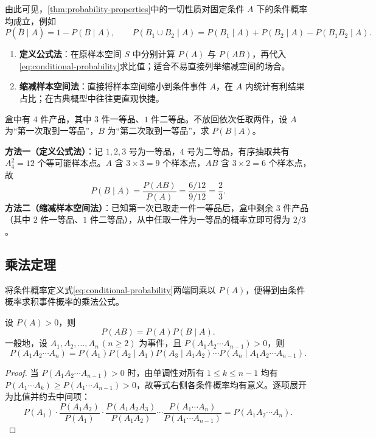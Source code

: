 由此可见，\cref{thm:probability-properties}中的一切性质对固定条件 $A$ 下的条件概率均成立，例如
\[
  P(\overline{B}\mid A)=1-P(B\mid A),\qquad
  P(B_1\cup B_2\mid A)=P(B_1\mid A)+P(B_2\mid A)-P(B_1B_2\mid A).
\]

\begin{method}[计算条件概率的两种途径]
\begin{enumerate}
  \item \textbf{定义公式法}：在原样本空间 $S$ 中分别计算 $P(A)$ 与 $P(AB)$，再代入\eqref{eq:conditional-probability}求比值；适合不易直接列举缩减空间的场合。
  \item \textbf{缩减样本空间法}：直接将样本空间缩小到条件事件 $A$，在 $A$ 内统计有利结果占比；在古典概型中往往更直观快捷。
\end{enumerate}
\end{method}

\begin{example}[title={用两种方法求条件概率}]
\label{eg:cond-two-ways}
盒中有 $4$ 件产品，其中 $3$ 件一等品、$1$ 件二等品。不放回依次任取两件，设 $A$ 为“第一次取到一等品”，$B$ 为“第二次取到一等品”，求 $P(B\mid A)$。
\begin{solution}
\textbf{方法一（定义公式法）}：记 $1,2,3$ 号为一等品，$4$ 号为二等品，有序抽取共有 $A_4^2=12$ 个等可能样本点。$A$ 含 $3\times 3=9$ 个样本点，$AB$ 含 $3\times 2=6$ 个样本点，故
\[
  P(B\mid A)=\frac{P(AB)}{P(A)}=\frac{6/12}{9/12}=\frac{2}{3}.
\]
\textbf{方法二（缩减样本空间法）}：已知第一次已取走一件一等品后，盒中剩余 $3$ 件产品（其中 $2$ 件一等品、$1$ 件二等品），从中任取一件为一等品的概率立即可得为 $2/3$。
\end{solution}
\end{example}

\subsection{乘法定理}

将条件概率定义式\eqref{eq:conditional-probability}两端同乘以 $P(A)$，便得到由条件概率求积事件概率的乘法公式。

\begin{theorem}[乘法定理]
\label{thm:multiplication}
设 $P(A)>0$，则
\begin{equation}
  P(AB)=P(A)P(B\mid A).
  \label{eq:multiplication-two}
\end{equation}
一般地，设 $A_1,A_2,\ldots,A_n\,(n\ge 2)$ 为事件，且 $P(A_1A_2\cdots A_{n-1})>0$，则
\begin{equation}
  P(A_1A_2\cdots A_n)=P(A_1)P(A_2\mid A_1)P(A_3\mid A_1A_2)\cdots P(A_n\mid A_1A_2\cdots A_{n-1}).
  \label{eq:multiplication-n}
\end{equation}
\end{theorem}
\begin{proof}
当 $P(A_1A_2\cdots A_{n-1})>0$ 时，由单调性对所有 $1\le k\le n-1$ 均有 $P(A_1\cdots A_k)\ge P(A_1\cdots A_{n-1})>0$，故等式右侧各条件概率均有意义。逐项展开为比值并约去中间项：
\[
  P(A_1)\cdot\frac{P(A_1A_2)}{P(A_1)}\cdot\frac{P(A_1A_2A_3)}{P(A_1A_2)}\cdots\frac{P(A_1\cdots A_n)}{P(A_1\cdots A_{n-1})}
  =P(A_1A_2\cdots A_n).
\]
\end{proof}


